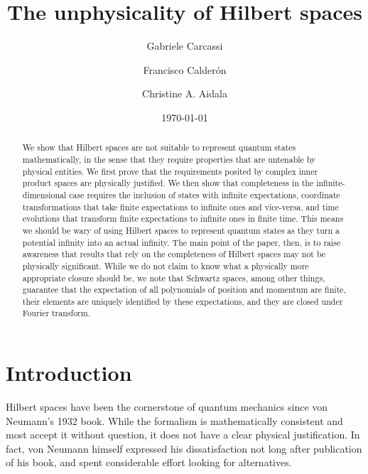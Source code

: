 \documentclass[10pt,twocolumn, nofootinbib]{revtex4-2}
\begin{document}
\title{The unphysicality of Hilbert spaces}
\author{Gabriele Carcassi}
\author{Francisco Calder\'on}
\author{Christine A. Aidala}

\date{\today}


\begin{abstract}
We show that Hilbert spaces are not suitable to represent quantum states mathematically, in the sense that they require properties that are untenable by physical entities. We first prove that the requirements posited by complex inner product spaces are physically justified. We then show that completeness in the infinite-dimensional case requires the inclusion of states with infinite expectations, coordinate transformations that take finite expectations to infinite ones and vice-versa, and time evolutions that transform finite expectations to infinite ones in finite time. This means we should be wary of using Hilbert spaces to represent quantum states as they turn a potential infinity into an actual infinity. The main point of the paper, then, is to raise awareness that results that rely on the completeness of Hilbert spaces may not be physically significant. While we do not claim to know what a physically more appropriate closure should be, we note that Schwartz spaces, among other things, guarantee that the expectation of all polynomials of position and momentum are finite, their elements are uniquely identified by these expectations, and they are closed under Fourier transform.
\end{abstract}

\maketitle

\section{Introduction}

Hilbert spaces have been the cornerstone of quantum mechanics since von Neumann's 1932 book.\cite{von_neumann_mathematische_1996} While the formalism is mathematically consistent and most accept it without question, it does not have a clear physical justification.\cite{heathcote_1990, hardy_2001} In fact, von Neumann himself expressed his dissatisfaction not long after publication of his book, and spent considerable effort looking for alternatives.\cite{vonNeumannHilbert_1996}
\end{document}
